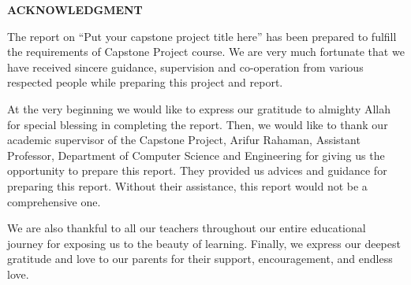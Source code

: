\clearpage
\thispagestyle{plain}


\begin{center}
    \textbf{\Large ACKNOWLEDGMENT}
\end{center}

\vspace{0.5cm}

The report on ``Put your capstone project title here'' has been prepared to fulfill the requirements of Capstone 
Project course. We are very much fortunate that we have received sincere guidance, 
supervision and co-operation from various respected people while preparing this project 
and report.

\vspace{0.5cm}   %

At the very beginning we would like to express our gratitude to almighty Allah for 
special blessing in completing the report. Then, we would like to thank our academic 
supervisor of the Capstone Project, Arifur Rahaman, Assistant Professor, Department of Computer Science and 
Engineering for giving us the opportunity to prepare this report. They provided us 
advices and guidance for preparing this report. Without their assistance, this report 
would not be a comprehensive one.

\vspace{0.5cm}   %

We are also thankful to all our teachers throughout our entire educational journey for 
exposing us to the beauty of learning. Finally, we express our deepest gratitude and 
love to our parents for their support, encouragement, and endless love.